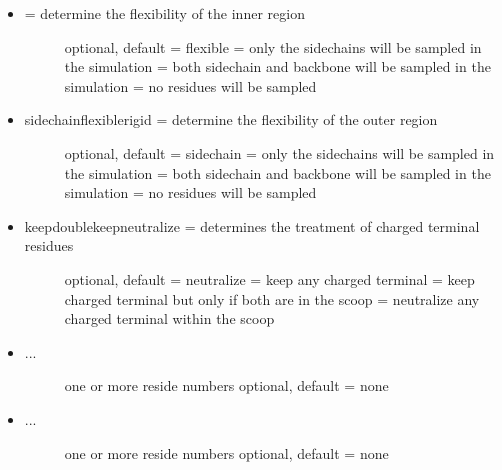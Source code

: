\documentclass[letterpaper,10pt,english]{manual}
\begin{document}
\begin{itemize}
\begin{description}
\end{description}

\item {} \begin{description}
\item[{ = determine the flexibility of the inner region}] \leavevmode
optional, default = flexible
 = only the sidechains will be sampled in the simulation
 = both sidechain and backbone will be sampled in the simulation
 = no residues will be sampled

\end{description}

\item {} \begin{description}
\item[{ sidechain\textbar{}flexible\textbar{}rigid = determine the flexibility of the outer region}] \leavevmode
optional, default = sidechain
 = only the sidechains will be sampled in the simulation
 = both sidechain and backbone will be sampled in the simulation
 = no residues will be sampled

\end{description}

\item {} \begin{description}
\item[{ keep\textbar{}doublekeep\textbar{}neutralize = determines the treatment of charged terminal residues}] \leavevmode
optional, default = neutralize
 = keep any charged terminal
 = keep charged terminal but only if both are in the scoop
 = neutralize any charged terminal within the scoop

\end{description}

\item {} \begin{description}
\item[{ ...}] \leavevmode
one or more reside numbers
optional, default = none

\end{description}

\item {} \begin{description}
\item[{ ...}] \leavevmode
one or more reside numbers
optional, default = none

\end{description}

\end{itemize}
\end{document}

